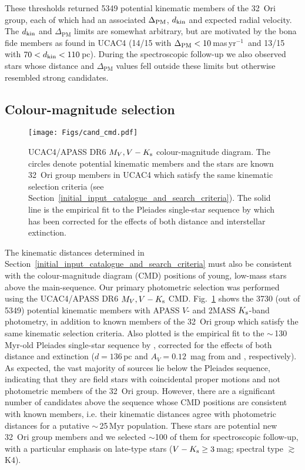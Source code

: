 \documentclass[usenatbib]{mnras}
\newcommand{\masyr}{mas\,yr$^{-1}$}
\begin{document}
These thresholds returned 5349 potential kinematic members of the
32~Ori group, each of which had an associated $\Delta_{\rm PM}$,
$d_{\rm kin}$ and expected radial velocity.  The $d_{\rm kin}$ and
$\Delta_{\mathrm{PM}}$ limits are somewhat arbitrary, but are
motivated by the bona fide members as found in UCAC4 (14/15 with
$\Delta_{\rm PM}< 10$\,\masyr\ and 13/15 with $70<d_{\rm
  kin}<110$\,pc). During the spectroscopic follow-up we also observed
stars whose distance and $\Delta_{\mathrm{PM}}$ values fell outside
these limits but otherwise resembled strong candidates.

\subsection{Colour-magnitude selection}
\label{colour_magnitude_selection}

\begin{figure}
\centering
\texttt{[image: Figs/cand\_cmd.pdf]}
\caption[]{UCAC4/APASS DR6 $M_{V}, V-K_{\rm{s}}$ colour-magnitude
  diagram. The circles denote potential kinematic members and the
  stars are known 32~Ori group members in UCAC4 which satisfy the same
  kinematic selection criteria (see
  Section~\ref{initial_input_catalogue_and_search_criteria}). The
  solid line is the empirical fit to the Pleiades single-star sequence
  by \cite{Stauffer07} which has been corrected for the effects of
  both distance and interstellar extinction.}
\label{fig:cand_cmd}
\end{figure}

The kinematic distances determined in
Section~\ref{initial_input_catalogue_and_search_criteria} must
also be consistent with
the colour-magnitude diagram (CMD) positions of young, low-mass stars
above the main-sequence. Our primary photometric selection was
performed using the UCAC4/APASS DR6 $M_{V}, V-K_{\rm{s}}$
CMD. Fig.~\ref{fig:cand_cmd} shows the 3730 (out of 5349) potential
kinematic members with APASS $V$- and 2MASS $K_{\rm{s}}$-band photometry, in
addition to known members of the 32~Ori group which satisfy the same
kinematic selection criteria. Also plotted is the empirical fit to the
$\sim$\,130\,Myr-old Pleiades single-star sequence by
\cite{Stauffer07}, corrected for the effects of both distance and
extinction ($d=136$\,pc and $A_{V}=0.12$~mag from \citealp{Melis14} and
\citealp{Stauffer98a}, respectively).  As expected, the vast majority
of sources lie below the Pleiades sequence, indicating that they are field
stars with coincidental proper motions and not photometric members of
the 32~Ori group. However, there are a significant number of candidates
above the sequence whose CMD positions are consistent with known
members, i.e. their kinematic distances agree with photometric distances
for a putative $\sim$\,25\,Myr population. These stars are 
potential new 32~Ori group members and we selected $\sim$100 of them for
spectroscopic follow-up, with a particular emphasis on late-type stars
($V-K_{\rm{s}} \geq 3$\,mag; spectral type $\gtrsim$\,K4).
\end{document}
